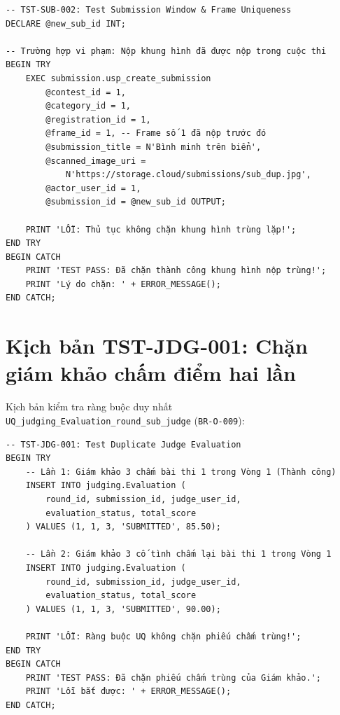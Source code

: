 \begin{verbatim}
-- TST-SUB-002: Test Submission Window & Frame Uniqueness
DECLARE @new_sub_id INT;

-- Trường hợp vi phạm: Nộp khung hình đã được nộp trong cuộc thi
BEGIN TRY
    EXEC submission.usp_create_submission
        @contest_id = 1,
        @category_id = 1,
        @registration_id = 1,
        @frame_id = 1, -- Frame số 1 đã nộp trước đó
        @submission_title = N'Bình minh trên biển',
        @scanned_image_uri = 
            N'https://storage.cloud/submissions/sub_dup.jpg',
        @actor_user_id = 1,
        @submission_id = @new_sub_id OUTPUT;
        
    PRINT 'LỖI: Thủ tục không chặn khung hình trùng lặp!';
END TRY
BEGIN CATCH
    PRINT 'TEST PASS: Đã chặn thành công khung hình nộp trùng!';
    PRINT 'Lý do chặn: ' + ERROR_MESSAGE();
END CATCH;
\end{verbatim}

\section{Kịch bản TST-JDG-001: Chặn giám khảo chấm điểm hai lần}
\label{a:tst_jdg_001}

Kịch bản kiểm tra ràng buộc duy nhất \texttt{UQ\_judging\_Evaluation\_round\_sub\_judge} (\texttt{BR-O-009}):

\begin{verbatim}
-- TST-JDG-001: Test Duplicate Judge Evaluation
BEGIN TRY
    -- Lần 1: Giám khảo 3 chấm bài thi 1 trong Vòng 1 (Thành công)
    INSERT INTO judging.Evaluation (
        round_id, submission_id, judge_user_id, 
        evaluation_status, total_score
    ) VALUES (1, 1, 3, 'SUBMITTED', 85.50);

    -- Lần 2: Giám khảo 3 cố tình chấm lại bài thi 1 trong Vòng 1
    INSERT INTO judging.Evaluation (
        round_id, submission_id, judge_user_id, 
        evaluation_status, total_score
    ) VALUES (1, 1, 3, 'SUBMITTED', 90.00);

    PRINT 'LỖI: Ràng buộc UQ không chặn phiếu chấm trùng!';
END TRY
BEGIN CATCH
    PRINT 'TEST PASS: Đã chặn phiếu chấm trùng của Giám khảo.';
    PRINT 'Lỗi bắt được: ' + ERROR_MESSAGE();
END CATCH;
\end{verbatim}
